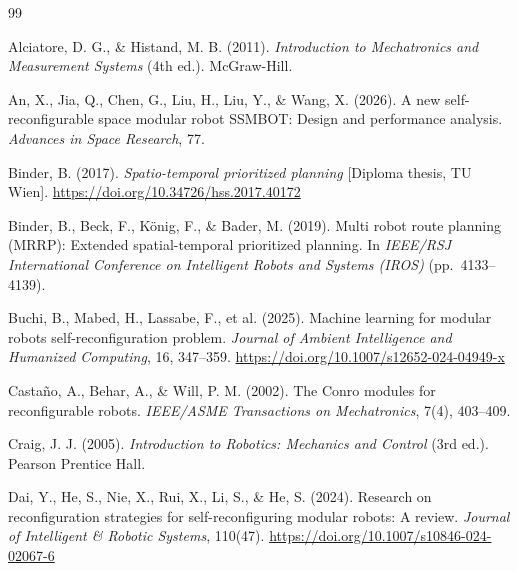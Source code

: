 \documentclass[11pt,a4paper]{article}
\begin{document}
{\small
\let\oldsection\section
\renewcommand{\section}[2]{}
\begin{thebibliography}{99}

Alciatore, D. G., \& Histand, M. B. (2011). \textit{Introduction to
Mechatronics and Measurement Systems} (4th ed.). McGraw-Hill.

An, X., Jia, Q., Chen, G., Liu, H., Liu, Y., \& Wang, X. (2026). A new
self-reconfigurable space modular robot SSMBOT: Design and performance
analysis. \textit{Advances in Space Research}, 77.

Binder, B. (2017). \textit{Spatio-temporal prioritized planning}
[Diploma thesis, TU Wien].
\url{https://doi.org/10.34726/hss.2017.40172}

Binder, B., Beck, F., K\"onig, F., \& Bader, M. (2019). Multi robot route
planning (MRRP): Extended spatial-temporal prioritized planning. In
\textit{IEEE/RSJ International Conference on Intelligent Robots and Systems
(IROS)} (pp.\ 4133--4139).

Buchi, B., Mabed, H., Lassabe, F., et al. (2025). Machine learning for modular
robots self-reconfiguration problem. \textit{Journal of Ambient Intelligence
and Humanized Computing}, 16, 347--359.
\url{https://doi.org/10.1007/s12652-024-04949-x}

Casta\~no, A., Behar, A., \& Will, P. M. (2002). The Conro modules for
reconfigurable robots. \textit{IEEE/ASME Transactions on Mechatronics}, 7(4),
403--409.

Craig, J. J. (2005). \textit{Introduction to Robotics: Mechanics and Control}
(3rd ed.). Pearson Prentice Hall.

Dai, Y., He, S., Nie, X., Rui, X., Li, S., \& He, S. (2024). Research on
reconfiguration strategies for self-reconfiguring modular robots: A review.
\textit{Journal of Intelligent \& Robotic Systems}, 110(47).
\url{https://doi.org/10.1007/s10846-024-02067-6}


\end{thebibliography}}
\end{document}
